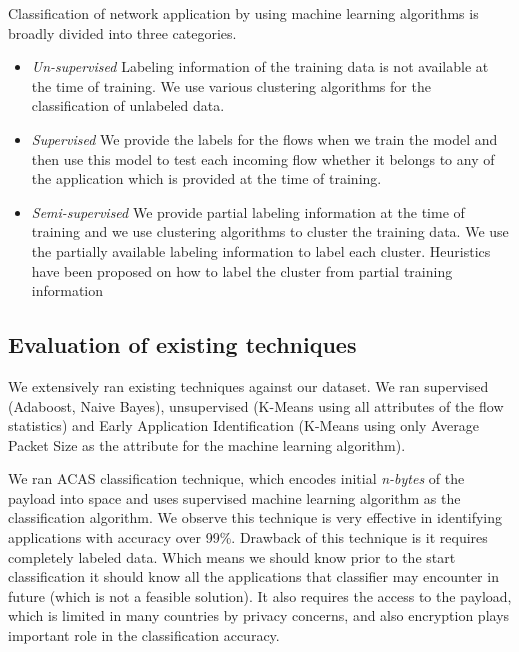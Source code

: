\documentclass[conference]{IEEEtran}
\begin{document}
Classification of network application by using machine learning algorithms is broadly divided into three categories.
\begin{itemize} \itemsep3pt \parskip3pt 
	\item \emph{Un-supervised} 
	Labeling information of the training data is not available at the time of training. We use various clustering algorithms for the classification of unlabeled data\cite{}.
	\item \emph{Supervised} 
	We provide the labels for the flows when we train the model and then use this model to test each incoming flow whether it belongs to any of the application which is provided at the time of training\cite{}. 
	\item \emph{Semi-supervised} 
	We provide partial labeling information at the time of training and we use clustering algorithms to cluster the training data. We use the partially available labeling information to label each cluster. Heuristics have been proposed on how to label the cluster from partial training information\cite{}
\end{itemize}

\subsection{Evaluation of existing techniques}
We extensively ran existing techniques\cite{} against our dataset. We ran supervised (Adaboost, Naive Bayes), unsupervised (K-Means using all attributes of the flow statistics) and Early Application Identification (K-Means using only Average Packet Size as the attribute for the machine learning algorithm). 

We ran ACAS classification technique, which encodes initial \textit{n-bytes} of the payload into space and uses supervised machine learning algorithm as the classification algorithm. We observe this technique is very effective in identifying applications with accuracy over 99\%. Drawback of this technique is it requires completely labeled data. Which means we should know prior to the start classification it should know all the applications that classifier may encounter in future (which is not a feasible solution). It also requires the access to the payload, which is limited in many countries by privacy concerns, and also encryption plays important role in the classification accuracy.
\end{document}
